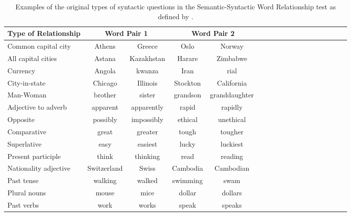 \begin{table}[h]

  \centering
  \caption{Examples of the original types of syntactic questions in the
    Semantic-Syntactic Word Relationship test as defined 
    by \cite{DBLP:journals/corr/abs-1301-3781}. }
  \label{tab:task_original_en}
  \small
  \begin{tabular}{ |l| |c|*{4}{c| |c| c | c }  }

  \hline           
  Type of Relationship &  \multicolumn{2}{c||}{Word Pair 1} &
  \multicolumn{2}{c|}{Word Pair 2} \\  \hline           
  Common capital city & Athens & Greece & Oslo  & Norway \\ 
  All capital cities  & Astana & Kazakhstan &  Harare & Zimbabwe  \\
  Currency & Angola & kwanza & Iran & rial \\  
  City-in-state  & Chicago & Illinois & Stockton & California \\  
  Man-Woman & brother & sister  & grandson & granddaughter \\  \hline  
  Adjective to adverb & apparent & apparently & rapid & rapidly  \\  
  Opposite & possibly & impossibly & ethical & unethical \\  
  Comparative & great & greater & tough & tougher \\  
  Superlative & easy & easiest & lucky & luckiest \\  
  Present participle & think & thinking & read & reading \\  
  Nationality adjective & Switzerland & Swiss & Cambodia  & Cambodian  \\  
  Past tense & walking & walked & swimming & swam \\ 
  Plural nouns  & mouse & mice & dollar & dollars \\  
  Past verbs & work & works & speak  & speaks  \\  \hline  
\end{tabular}
\end{table}


